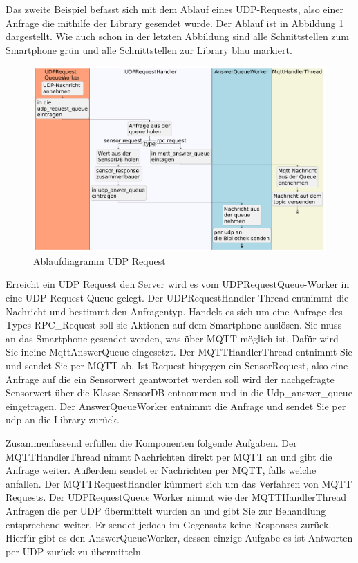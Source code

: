 \documentclass[11pt,a4paper]{report}
\begin{document}
Das zweite Beispiel befasst sich mit dem Ablauf eines UDP-Requests, also einer Anfrage die mithilfe der Library gesendet wurde.
Der Ablauf ist in Abbildung \ref{fig:serverUDPReqPath} dargestellt.
Wie auch schon in der letzten Abbildung sind alle Schnittstellen zum Smartphone grün und alle Schnittstellen zur Library blau markiert.
\begin{figure}[htbp]
  \centering
  \includegraphics[width=\textwidth]{images/UDPRequestServerPath}
  \caption{Ablaufdiagramm UDP Request}
  \label{fig:serverUDPReqPath}
\end{figure}
Erreicht ein UDP Request den Server wird es vom UDPRequestQueue-Worker in eine UDP Request Queue gelegt.
Der UDPRequestHandler-Thread entnimmt die Nachricht und bestimmt den Anfragentyp.
Handelt es sich um eine Anfrage des Types RPC\_Request soll sie Aktionen auf dem Smartphone auslösen.
Sie muss an das Smartphone gesendet werden, was über MQTT möglich ist.
Dafür wird Sie ineine MqttAnswerQueue eingesetzt.
Der MQTTHandlerThread entnimmt Sie und sendet Sie per MQTT ab.
Ist Request hingegen ein SensorRequest, also eine Anfrage auf die ein Sensorwert geantwortet werden soll wird der nachgefragte Sensorwert über die Klasse SensorDB entnommen und in die Udp\_answer\_queue eingetragen.
Der AnswerQueueWorker entnimmt die Anfrage und sendet Sie per udp an die Library zurück.

Zusammenfassend erfüllen die Komponenten folgende Aufgaben.
Der MQTTHandlerThread nimmt Nachrichten direkt per MQTT an und gibt die Anfrage weiter.
Außerdem sendet er Nachrichten per MQTT, falls welche anfallen.
Der MQTTRequestHandler kümmert sich um das Verfahren von MQTT Requests.
Der UDPRequestQueue Worker nimmt wie der MQTTHandlerThread Anfragen die per UDP übermittelt wurden an und gibt Sie zur Behandlung entsprechend weiter.
Er sendet jedoch im Gegensatz keine Responses zurück.
Hierfür gibt es den AnswerQueueWorker, dessen einzige Aufgabe es ist Antworten per UDP zurück zu übermitteln.
\end{document}
